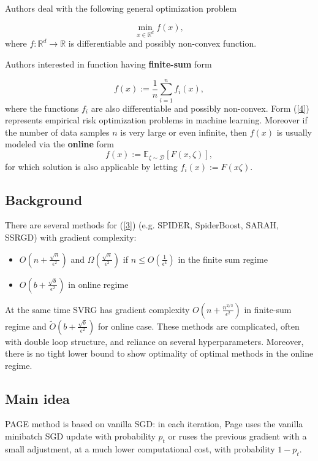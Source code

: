 \documentclass{article}
\begin{document}
Authors deal with the following general optimization problem

\[\min_{x\in \mathbb{R}^d} f(x), \tag{3} \label{3}\]
where \(f: \mathbb{R}^d \rightarrow \mathbb{R}\) is differentiable and possibly non-convex function.

Authors interested in function having \textbf{finite-sum} form 

\[f(x) := \frac{1}{n} \sum_{i=1}^{n} f_i(x), \tag{4} \label{4}\]
where the functions \(f_i\) are also differentiable and possibly non-convex. Form (\ref{4}) 
represents empirical risk optimization problems in machine learning. Moreover if the 
number of data samples \(n\) is very large or even infinite, then \(f(x)\) is usually modeled
via the \textbf{online} form
\[f(x) := \mathbb{E}_{\zeta \sim \mathcal{D}} [F(x, \zeta)], \tag{5} \label{5}\]
for which solution is also applicable by letting \(f_i(x) := F(x\zeta)\).

\subsection{Background}

There are several methods for (\ref{3}) (e.g. SPIDER, SpiderBoost, 
SARAH, SSRGD) with gradient complexity:
\begin{itemize}
  \item \(O(n+\frac{\sqrt{n}}{\epsilon^2})\) and 
  \(\Omega(\frac{\sqrt{n}}{\epsilon^2})\) if \(n \leq O(\frac{1}{\epsilon^4})\) 
  in the finite sum regime
  \item \(O(b+\frac{\sqrt{b}}{\epsilon^2})\) in online regime
\end{itemize} 
At the same time SVRG has gradient complexity \(O(n+\frac{n^{2/3}}{\epsilon^2})\) in finite-sum 
regime and \(\tilde{O}(b+\frac{\sqrt{b}}{\epsilon^2})\) for online case.
These methods are complicated, often with double loop structure, and reliance on several hyperparameters.
Moreover, there is no tight lower bound to show optimality of optimal methods in the online regime.

\subsection{Main idea}

PAGE method is based on vanilla SGD: in each iteration, Page uses the vanilla minibatch SGD update 
with probability \(p_t\) or ruses the previous gradient with a small adjustment, at a much
lower computational cost, with probability \(1-p_t\).
\end{document}
